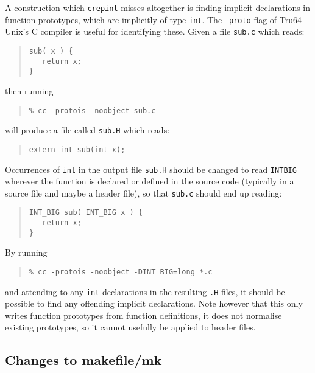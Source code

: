 \documentclass[twoside,11pt]{article}
\renewcommand{\_}{\texttt{\symbol{95}}}
\newcommand{\file}[1]{{\tt #1}}
\newcommand{\routine}[1]{{\tt #1}}
\newcommand{\cc}[1]{{\tt #1}}
\newenvironment{squote}{\begin{quote}\begin{small}}{\end{small}\end{quote}}
\begin{document}
A construction which \routine{crepint} misses altogether is finding
implicit declarations in function prototypes, which are implicitly
of type \cc{int}.
The {\tt -proto} flag of Tru64 Unix's C compiler is useful for identifying
these.
Given a file \file{sub.c} which reads:
\begin{squote}
\begin{verbatim}
sub( x ) {
   return x;
}
\end{verbatim}
\end{squote}
then running
\begin{squote}
\begin{verbatim}
% cc -protois -noobject sub.c
\end{verbatim}
\end{squote}
will produce a file called \file{sub.H} which reads:
\begin{squote}
\begin{verbatim}
extern int sub(int x);
\end{verbatim}
\end{squote}
Occurrences of \cc{int} in the output file \file{sub.H} should be 
changed to read \cc{INT\_BIG} wherever the function is declared or
defined in the source code (typically in a source file and maybe a 
header file), so that \file{sub.c} should
end up reading:
\begin{squote}
\begin{verbatim}
INT_BIG sub( INT_BIG x ) {
   return x;
}
\end{verbatim}
\end{squote}
By running
\begin{squote}
\begin{verbatim}
% cc -protois -noobject -DINT_BIG=long *.c
\end{verbatim}
\end{squote}
and attending to any \cc{int} declarations in the resulting \file{.H} files,
it should be possible to find any offending implicit declarations.
Note however that this only writes function prototypes 
from function definitions, it does not normalise existing prototypes,
so it cannot usefully be applied to header files.


\subsection{Changes to makefile/mk\label{sec:makefile}}
\end{document}
